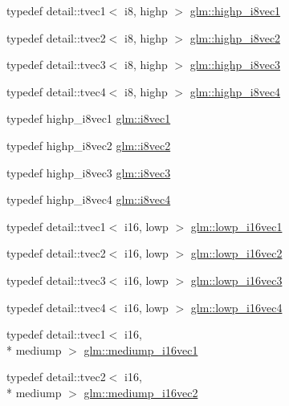 \begin{DoxyCompactItemize}
\item 
typedef detail\-::tvec1$<$ i8, highp $>$ \hyperlink{group__gtc__type__precision_ga0334353753f93388bcc89f91c9aff476}{glm\-::highp\-\_\-i8vec1}
\item 
typedef detail\-::tvec2$<$ i8, highp $>$ \hyperlink{group__gtc__type__precision_ga2224945795a870e41d951f0847d54f02}{glm\-::highp\-\_\-i8vec2}
\item 
typedef detail\-::tvec3$<$ i8, highp $>$ \hyperlink{group__gtc__type__precision_gad716792169ce7de963df25b865714438}{glm\-::highp\-\_\-i8vec3}
\item 
typedef detail\-::tvec4$<$ i8, highp $>$ \hyperlink{group__gtc__type__precision_ga283b2f580a4bd7207d27418ef4a1068b}{glm\-::highp\-\_\-i8vec4}
\item 
typedef highp\-\_\-i8vec1 \hyperlink{group__gtc__type__precision_gae67d2e1e7ebd1a79176cac554395b881}{glm\-::i8vec1}
\item 
typedef highp\-\_\-i8vec2 \hyperlink{group__gtc__type__precision_gafd7bbd3878c298014276975f999a8677}{glm\-::i8vec2}
\item 
typedef highp\-\_\-i8vec3 \hyperlink{group__gtc__type__precision_gae1e3127c58fbf1b6fbf28885cfd3dfad}{glm\-::i8vec3}
\item 
typedef highp\-\_\-i8vec4 \hyperlink{group__gtc__type__precision_ga89bb5e6481ae11fb2599b71e36a390bb}{glm\-::i8vec4}
\item 
typedef detail\-::tvec1$<$ i16, lowp $>$ \hyperlink{group__gtc__type__precision_ga6f1e42c07424a2f14faf731c74ba2153}{glm\-::lowp\-\_\-i16vec1}
\item 
typedef detail\-::tvec2$<$ i16, lowp $>$ \hyperlink{group__gtc__type__precision_ga47c5d4c919266799ecc76d832356feff}{glm\-::lowp\-\_\-i16vec2}
\item 
typedef detail\-::tvec3$<$ i16, lowp $>$ \hyperlink{group__gtc__type__precision_ga5b71f24a26316aa21f3c58d25c8db9a8}{glm\-::lowp\-\_\-i16vec3}
\item 
typedef detail\-::tvec4$<$ i16, lowp $>$ \hyperlink{group__gtc__type__precision_ga59ea63973187e1e990fb6633d1800c6d}{glm\-::lowp\-\_\-i16vec4}
\item 
typedef detail\-::tvec1$<$ i16, \\*
mediump $>$ \hyperlink{group__gtc__type__precision_ga6a1d37139ea8990de24edf4bfa3500ad}{glm\-::mediump\-\_\-i16vec1}
\item 
typedef detail\-::tvec2$<$ i16, \\*
mediump $>$ \hyperlink{group__gtc__type__precision_ga664a0266910df3c2d6559651f94d32e6}{glm\-::mediump\-\_\-i16vec2}

\end{DoxyCompactItemize}
